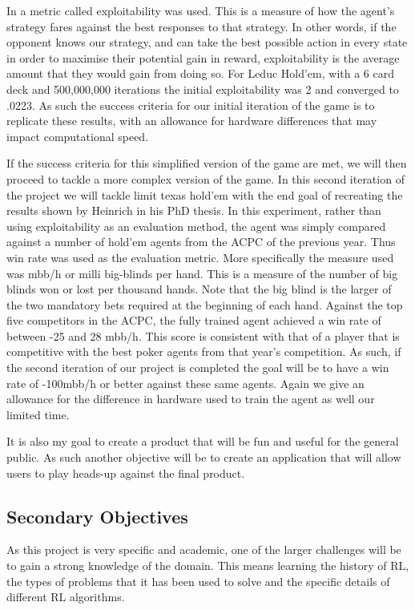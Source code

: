 In\citep{heinrich2015smooth} a metric called exploitability was used.
This is a measure of how the agent's strategy fares against the best responses to that strategy.
In other words, if the opponent knows our strategy, and can take the best possible action
in every state in order to maximise their potential gain in reward, exploitability is the
average amount that they would gain from doing so.
For Leduc Hold'em, with a 6 card deck and 500,000,000 iterations the initial exploitability was 2 and converged
to .0223.
As such the success criteria for our initial iteration of the game is to replicate these results, with an
allowance for hardware differences that may impact computational speed.

If the success criteria for this simplified version of the game are met, we will then proceed to tackle
a more complex version of the game.
In this second iteration of the project we will tackle limit texas hold'em with the end goal of recreating
the results shown by Heinrich in his PhD thesis\citep{heinrich2017reinforcement}.
In this experiment, rather than using exploitability as an evaluation method, the agent was simply compared
against a number of hold'em agents from the ACPC of the previous year.
Thus win rate was used as the evaluation metric.
More specifically the measure used was mbb/h or milli big-blinds per hand.
This is a measure of the number of big blinds won or lost per thousand hands.
Note that the big blind is the larger of the two mandatory bets required at the beginning of each hand.
Against the top five competitors in the ACPC, the fully trained agent achieved a win rate of between
-25 and 28 mbb/h.
This score is consistent with that of a player that is competitive with the best poker agents from that
year's competition.
As such, if the second iteration of our project is completed the goal will be to have a win rate of -100mbb/h
or better against these same agents.
Again we give an allowance for the difference in hardware used to train the agent as well our limited time.

It is also my goal to create a product that will be fun and useful for the general public.
As such another objective will be to create an application that will allow users to play heads-up against the final product.

\subsection{Secondary Objectives}\label{subsec:secondaryObjectives}
As this project is very specific and academic, one of the larger challenges will be to gain a strong knowledge
of the domain.
This means learning the history of RL, the types of problems that it has been used to solve and the specific details of
different RL algorithms.

